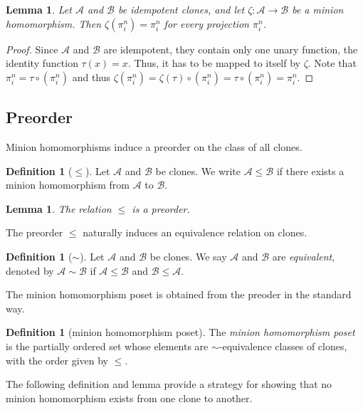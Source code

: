 \documentclass{amsart}
\numberwithin{equation}{section}
\theoremstyle{plain}
\newtheorem{lemma}[theorem]{Lemma}
\theoremstyle{definition}
\newtheorem{definition}[theorem]{Definition}
\def\clone#1{\mathcal{#1}}
\begin{document}
\begin{lemma}
\label{projtoproj}
Let $\clone{A}$ and $\clone{B}$ be idempotent clones, and let $\zeta:\clone{A}\to \clone{B}$ be a minion homomorphism. Then $\zeta(\pi_i^n) = \pi_i^n$ for every projection $\pi_i^n$.
\end{lemma}
\begin{proof}
Since $\clone{A}$ and $\clone{B}$ are idempotent, they contain only one unary function, the identity function $\tau(x) = x$. Thus, it has to be mapped to itself by $\zeta$. Note that $\pi_i^n = \tau\circ(\pi_i^n)$ and thus $\zeta(\pi_i^n) = \zeta(\tau)\circ(\pi_i^n) = \tau\circ(\pi_i^n) = \pi_i^n$. 
\end{proof}

\subsection{Preorder}

Minion homomorphisms induce a preorder on the class of all clones.

\begin{definition}[$\leq$]
Let $\clone{A}$ and $\clone{B}$ be clones. We write $\clone{A}\leq \clone{B}$ if there exists a minion homomorphism from $\clone{A}$ to $ \clone{B}$.
\end{definition}

\begin{lemma}
The relation $\leq$ is a preorder.
\end{lemma}

The preorder $\leq$ naturally induces an equivalence relation on clones.

\begin{definition}[$\sim$]
Let $\clone{A}$ and $\clone{B}$ be clones. We say $\clone{A}$ and $\clone{B}$ are {\it equivalent}, denoted by $\clone{A}\sim \clone{B}$ if $\clone{A}\leq \clone{B}$ and $\clone{B}\leq \clone{A}$.
\end{definition}

The minion homomorphism poset is obtained from the preoder in the standard way.

\begin{definition}[minion homomorphism poset]
The \emph{minion homomorphism poset} is the partially ordered set whose elements are $\sim$-equivalence classes of clones, with the order given by $\le$.    
\end{definition}


The following definition and lemma provide a strategy for showing that no minion homomorphism exists from one clone to another.
\end{document}
